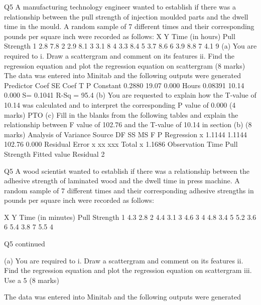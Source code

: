 
\newpage
Q5
A manufacturing technology engineer wanted to establish if there was a relationship between the pull strength of injection moulded parts and the dwell time in the mould. A random sample of 7 different times and their corresponding pounds per square inch were recorded as follows:
X	Y
Time (in hours)	Pull Strength
1	2.8	7.8
2	2.9	8.1
3	3.1	8
4	3.3	8.4
5	3.7	8.6
6	3.9	8.8
7	4.1	9
(a) 	You are required to 
i.	Draw a scattergram and comment on its features
ii.	Find the regression equation and plot the regression equation on scattergram
(8 marks)
The data was entered into Minitab and the following outputs were generated
Predictor	Coef		SE Coef	T		P
Constant			0.2880		19.07		0.000
Hours				0.08391	10.14		0.000
S= 0.1041	R-Sq = 95.4%
(b) 	You are requested to explain how the T-value of 10.14 was calculated and to 
interpret the corresponding P value of 0.000
(4 marks)
PTO
(c)	Fill in the blanks from the following tables and explain the relationship between F value of 102.76 and the T-value of 10.14 in section (b)
(8 marks)
Analysis of Variance
Source			DF		SS		MS		F		P
Regression		x		1.1144		1.1144		102.76		0.000
Residual Error		x		xx		xxx		
Total			x		1.1686
Observation		Time		Pull Strength		Fitted value	Residual
2		
\newpage
	
	Q5
	A wood scientist wanted to establish if there was a relationship between the adhesive strength of laminated wood and the dwell time in press machine. A random sample of 7 different times and their corresponding adhesive strengths in pounds per square inch were recorded as follows:
	
	
	X	Y
	Time (in minutes)	Pull Strength
	1	4.3	2.8
	2	4.4	3.1
	3	4.6	3
	4	4.8	3.4
	5	5.2	3.6
	6	5.4	3.8
	7	5.5	4
	
	
	Q5 continued
	
	(a) 	You are required to 
	i.	Draw a scattergram and comment on its features
	ii.	Find the regression equation and plot the regression equation on scattergram
	iii.	Use a 5%
	(8 marks)
	
	The data was entered into Minitab and the following outputs were generated
	
